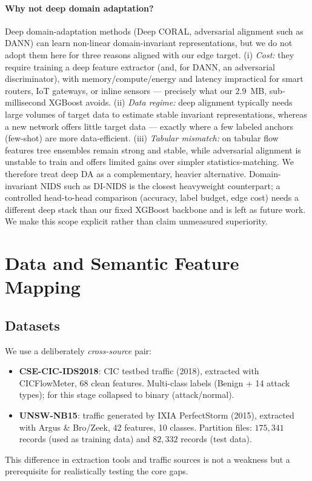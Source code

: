 \documentclass[preprint,12pt,authoryear]{elsarticle}
\begin{document}
\paragraph{Why not deep domain adaptation?} Deep domain-adaptation methods (Deep
CORAL, adversarial alignment such as DANN) can learn non-linear domain-invariant
representations, but we do not adopt them here for three reasons aligned with our
edge target. (i) \emph{Cost:} they require training a deep feature extractor (and,
for DANN, an adversarial discriminator), with memory/compute/energy and latency
impractical for smart routers, IoT gateways, or inline sensors --- precisely what
our $2.9$~MB, sub-millisecond XGBoost avoids. (ii) \emph{Data regime:} deep
alignment typically needs large volumes of target data to estimate stable invariant
representations, whereas a new network offers little target data --- exactly where a
few labeled anchors (few-shot) are more data-efficient. (iii) \emph{Tabular
mismatch:} on tabular flow features tree ensembles remain strong and stable, while
adversarial alignment is unstable to train and offers limited gains over simpler
statistics-matching. We therefore treat deep DA as a complementary, heavier
alternative. Domain-invariant NIDS such as DI-NIDS \citep{layeghy} is the closest
heavyweight counterpart; a controlled head-to-head comparison (accuracy, label
budget, edge cost) needs a different deep stack than our fixed XGBoost backbone and
is left as future work. We make this scope explicit rather than claim unmeasured
superiority.

\section{Data and Semantic Feature Mapping}
\label{sec:sfm}

\subsection{Datasets}
We use a deliberately \emph{cross-source} pair:
\begin{itemize}
  \item \textbf{CSE-CIC-IDS2018}: CIC testbed traffic (2018), extracted with
  CICFlowMeter, 68 clean features. Multi-class labels (Benign + 14 attack types);
  for this stage collapsed to binary (attack/normal).
  \item \textbf{UNSW-NB15}: traffic generated by IXIA PerfectStorm (2015),
  extracted with Argus \& Bro/Zeek, 42 features, 10 classes. Partition files:
  $175{,}341$ records (used as training data) and $82{,}332$ records (test data).
\end{itemize}
This difference in extraction tools and traffic sources is not a weakness but a
prerequisite for realistically testing the core gaps.
\end{document}
